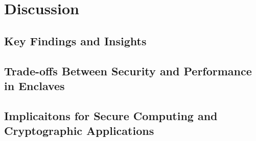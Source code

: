 \chapter{Discussion}
\label{chap:discussion}

\section{Key Findings and Insights}


\section{Trade-offs Between Security and Performance in Enclaves}

\section{Implicaitons for Secure Computing and Cryptographic Applications}